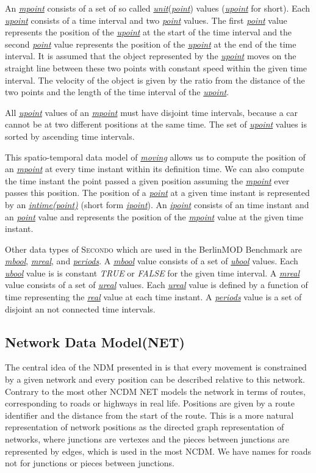\documentclass[a4paper]{article}
\newcommand{\secondo}{\textsc{Secondo}}
\newcommand{\bmodb} {BerlinMOD Benchmark}
\newcommand{\dt}[1]{\textsl{\underline{#1}}}
\newcommand{\true}{\textsl{TRUE}}
\newcommand{\false}{\textsl{FALSE}}
\begin{document}
An \dt{mpoint} consists of a set of so called \dt{unit}(\dt{point}) values
(\dt{upoint} for short).
Each \dt{upoint} consists of a time interval and two \dt{point} values. The first
\dt{point} value represents the position of the \dt{upoint} at the start of the
time interval and the second \dt{point} value represents the position of the
\dt{upoint} at the end of the time interval. It is assumed that the object
represented
by the \dt{upoint} moves on the straight line between these two points with constant
speed within the given time interval. The velocity of the object is given by the
ratio from the distance of the two points and the length of the time interval of
the \dt{upoint}.

All \dt{upoint} values of an \dt{mpoint} must have disjoint time intervals,
because a car cannot be at two different positions at the same time.
The set of \dt{upoint} values is sorted by ascending time intervals.

This spatio-temporal data model of \dt{moving} allows us to compute the position
of an \dt{mpoint} at every time instant within its definition time.
We can also compute the time instant the point passed a
given position assuming the \dt{mpoint} ever passes this position. The position of a
\dt{point} at a given time instant is represented by an \dt{intime(point)}
(short form \dt{ipoint}). An \dt{ipoint} consists of an time instant and an
\dt{point}
value and represents the position of the \dt{mpoint} value at the given time
instant.

Other data types of \secondo{} which are used in the \bmodb{} are \dt{mbool},
\dt{mreal}, and \dt{periods}. A \dt{mbool} value consists of a set of \dt{ubool}
values. Each \dt{ubool} value is is constant \true{} or \false{} for the given
time interval. A \dt{mreal} value consists of a set of \dt{ureal} values. Each
\dt{ureal} value is defined by a function of time representing the \dt{real}
value at each time instant. A \dt{periods} value is a set of disjoint an not
connected time intervals.
\subsection{Network Data Model(NET)}
\label{sec:netdatamod}
The central idea of the NDM presented in \cite{NetworkGueting} is that
every movement is constrained by a given network and every position can be described
relative to this network. Contrary to the most other NCDM NET models the network
in terms of routes, corresponding to roads or highways in real life. Positions
are given by a route identifier and the distance from the start of the route.
This is a more natural representation of network positions as the directed graph
representation of networks, where junctions are vertexes and the pieces between
junctions are represented by edges, which is used in the most NCDM. We have names
for roads not for junctions or pieces between junctions.
\end{document}
